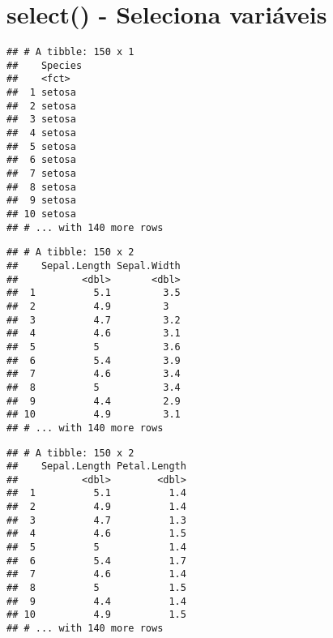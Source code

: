\documentclass[]{book}
\newenvironment{Shaded}{\begin{snugshade}}{\end{snugshade}}
\newcommand{\KeywordTok}[1]{\textcolor[rgb]{0.13,0.29,0.53}{\textbf{#1}}}
\newcommand{\NormalTok}[1]{#1}
\newcommand{\OperatorTok}[1]{\textcolor[rgb]{0.81,0.36,0.00}{\textbf{#1}}}
\newcommand{\StringTok}[1]{\textcolor[rgb]{0.31,0.60,0.02}{#1}}
\begin{document}
\hypertarget{select---seleciona-variuxe1veis}{%
\section{select() - Seleciona variáveis}\label{select---seleciona-variuxe1veis}}

\begin{Shaded}
\end{Shaded}

\begin{verbatim}
## # A tibble: 150 x 1
##    Species
##    <fct>  
##  1 setosa 
##  2 setosa 
##  3 setosa 
##  4 setosa 
##  5 setosa 
##  6 setosa 
##  7 setosa 
##  8 setosa 
##  9 setosa 
## 10 setosa 
## # ... with 140 more rows
\end{verbatim}

\begin{Shaded}
\end{Shaded}

\begin{verbatim}
## # A tibble: 150 x 2
##    Sepal.Length Sepal.Width
##           <dbl>       <dbl>
##  1          5.1         3.5
##  2          4.9         3  
##  3          4.7         3.2
##  4          4.6         3.1
##  5          5           3.6
##  6          5.4         3.9
##  7          4.6         3.4
##  8          5           3.4
##  9          4.4         2.9
## 10          4.9         3.1
## # ... with 140 more rows
\end{verbatim}

\begin{Shaded}
\end{Shaded}

\begin{verbatim}
## # A tibble: 150 x 2
##    Sepal.Length Petal.Length
##           <dbl>        <dbl>
##  1          5.1          1.4
##  2          4.9          1.4
##  3          4.7          1.3
##  4          4.6          1.5
##  5          5            1.4
##  6          5.4          1.7
##  7          4.6          1.4
##  8          5            1.5
##  9          4.4          1.4
## 10          4.9          1.5
## # ... with 140 more rows
\end{verbatim}
\end{document}
